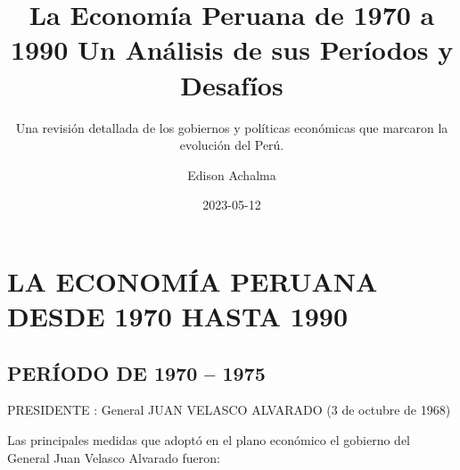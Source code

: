 \documentclass[
  letterpaper,
  DIV=11,
  numbers=noendperiod]{scrartcl}
\title{La Economía Peruana de 1970 a 1990 Un Análisis de sus Períodos y
Desafíos}
\subtitle{Una revisión detallada de los gobiernos y políticas económicas
que marcaron la evolución del Perú.}
\author{Edison Achalma}
\date{2023-05-12}
\begin{document}
\maketitle
\ifdefined\Shaded\renewenvironment{Shaded}{\begin{tcolorbox}[boxrule=0pt, frame hidden, breakable, enhanced, sharp corners, borderline west={3pt}{0pt}{shadecolor}, interior hidden]}{\end{tcolorbox}}\fi

\hypertarget{la-economuxeda-peruana-desde-1970-hasta-1990}{%
\section{LA ECONOMÍA PERUANA DESDE 1970 HASTA
1990}\label{la-economuxeda-peruana-desde-1970-hasta-1990}}

\hypertarget{peruxedodo-de-1970-1975}{%
\subsection{PERÍODO DE 1970 -- 1975}\label{peruxedodo-de-1970-1975}}

PRESIDENTE : General JUAN VELASCO ALVARADO (3 de octubre de 1968)

Las principales medidas que adoptó en el plano económico el gobierno del
General Juan Velasco Alvarado fueron:
\end{document}
